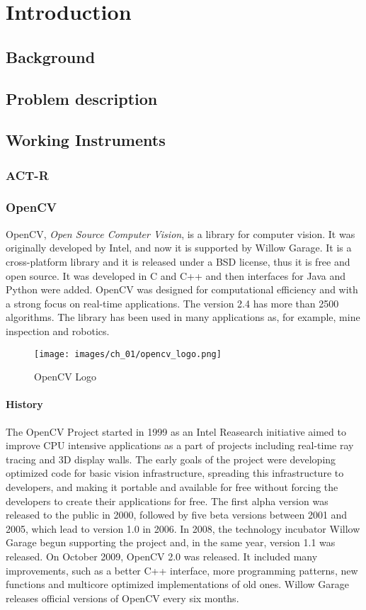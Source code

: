 \chapter{Introduction}
\section{Background}
\section{Problem description}
\section{Working Instruments}
\subsection{ACT-R}
\subsection{OpenCV}
	OpenCV, \emph{Open Source Computer Vision}, is a library for computer vision. It was originally developed by Intel, and now it is supported by Willow Garage.
	It is a cross-platform library and it is released under a BSD license, thus it is free and open source. It was developed in C and C++ and then interfaces for Java and Python were added. OpenCV was designed for computational efficiency and with a strong focus on real-time applications. The version 2.4 has more than 2500 algorithms. The library has been used in many applications as, for example, mine inspection and robotics.
	\begin{wrapfigure}{l}{0.2\textwidth}
  		\begin{center}
  	  	\texttt{[image: images/ch\_01/opencv\_logo.png]}
  		\end{center}
  		\caption{OpenCV Logo}
	\end{wrapfigure}		
	
	\subsubsection*{History}
	The OpenCV Project started in 1999 as an Intel Reasearch initiative aimed to improve CPU intensive applications as a part of projects including real-time ray tracing and 3D display walls. The early goals of the project were developing optimized code for basic vision infrastructure, spreading this infrastructure to developers, and making it portable and available for free without forcing the developers to create their applications for free.
	The first alpha version was released to the public in 2000, followed by five beta versions between 2001 and 2005, which lead to version 1.0 in 2006. In 2008, the technology incubator Willow Garage begun supporting the project and, in the same year, version 1.1  was released. 
	On October 2009, OpenCV 2.0 was released. It included many improvements, such as a better C++ interface, more programming patterns, new functions and multicore optimized implementations of old ones. Willow Garage releases official versions of OpenCV every six months.

